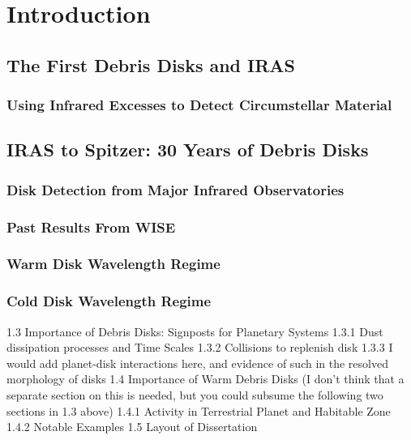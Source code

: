 \section{Introduction}\label{sec:intro}

    \subsection{The First Debris Disks and IRAS}\label{sec:1stdisk_iras}

                        
        \subsubsection{Using Infrared Excesses to Detect Circumstellar Material}\label{sec:excess_detection}
        
        
    \subsection{IRAS to Spitzer: 30 Years of Debris Disks}\label{sec:30years}
    
        \subsubsection{Disk Detection from Major Infrared Observatories}\label{sec:IR_observatories}
        
        \subsubsection{Past Results From WISE}\label{sec:past_wise}
        
        \subsubsection{Warm Disk Wavelength Regime}
        
        \subsubsection{Cold Disk Wavelength Regime}
        
        
1.3	Importance of Debris Disks: Signposts for Planetary Systems
    1.3.1	Dust dissipation processes and Time Scales
    1.3.2	Collisions to replenish disk 
    1.3.3	I would add planet-disk interactions here, and evidence of such in the resolved morphology of disks
1.4	Importance of Warm Debris Disks (I don’t think that a separate section on this is needed, but you could subsume the following two sections in 1.3 above)
    1.4.1	Activity in Terrestrial Planet and Habitable Zone
    1.4.2	Notable Examples	
1.5	Layout of Dissertation

        